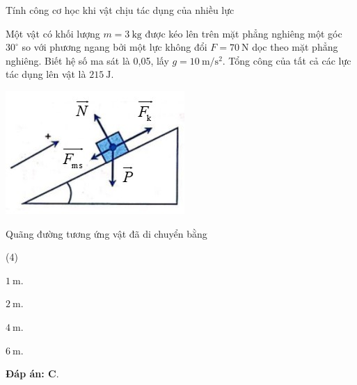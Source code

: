 \begin{dang}{Tính công cơ học khi vật chịu tác dụng của nhiều lực}
{			Một vật có khối lượng $m=\SI{3}{\kilogram}$ được kéo lên trên mặt phẳng nghiêng một góc $30^\circ$ so với phương ngang bởi một lực không đổi $F=\SI{70}{\newton}$ dọc theo mặt phẳng nghiêng. Biết hệ số ma sát là 0,05, lấy $g=\SI{10}{\meter/\second^2}$. Tổng công của tất cả các lực tác dụng lên vật là $\SI{215}{\joule}$.
			\begin{center}
				\includegraphics[scale=0.6]{../figs/VN10-PH-30-P-022-1-H2.jpg}
			\end{center}
			Quãng đường tương ứng vật đã di chuyển bằng
			\begin{mcq}(4)
				\item $\SI{1}{\meter}$.
				\item $\SI{2}{\meter}$.
				\item $\SI{4}{\meter}$.
				\item $\SI{6}{\meter}$.
			\end{mcq}
			
			\textbf{Đáp án: C}.
		}
	\end{dang}
	
